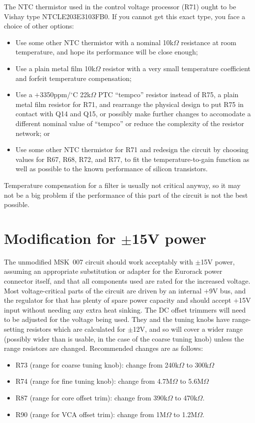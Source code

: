 The NTC thermistor used in the control voltage processor (R71) ought to be
Vishay type NTCLE203E3103FB0.  If you cannot get this exact type, you
face a choice of other options:
\begin{itemize}
\item Use some other NTC thermistor with a nominal 10k$\Omega$ resistance at
room temperature, and hope its performance will be close enough;
\item Use a plain metal film 10k$\Omega$ resistor with a very small
temperature coefficient and forfeit temperature compensation;
\item Use a $+$3350ppm/$^\circ$C 22k$\Omega$ PTC ``tempco'' resistor
instead of R75, a plain metal film resistor for R71, and rearrange the
physical design to put R75 in contact with Q14 and Q15, or possibly make
further changes to accomodate a different nominal value of ``tempco''
or reduce the complexity of the resistor network; or
\item Use some other NTC thermistor for R71 and redesign the circuit by
choosing values for R67, R68, R72, and R77, to fit the temperature-to-gain
function as well as possible to the known performance of silicon transistors.
\end{itemize}
Temperature compensation for a filter is usually not critical anyway, so it
may not be a big problem if the performance of this part of the circuit is
not the best possible.

\section{Modification for $\pm$15V power}

The unmodified MSK~007 circuit should work acceptably with $\pm$15V power,
assuming an appropriate substitution or adapter for the Eurorack power
connector itself, and that all components used are rated for the increased
voltage.  Most voltage-critical parts of the circuit are driven by an
internal $+$9V bus, and the regulator for that has plenty of spare power
capacity and should accept $+$15V input without needing any extra heat
sinking.  The DC offset trimmers will need to be adjusted for the voltage
being used.  They and the tuning knobs have range-setting resistors which
are calculated for $\pm$12V, and so will cover a wider range (possibly wider
than is usable, in the case of the coarse tuning knob) unless the range
resistors are changed.  Recommended changes are as follows:

\begin{itemize}
\item R73 (range for coarse tuning knob):  change from 240k$\Omega$ to
  300k$\Omega$
\item R74 (range for fine tuning knob):  change from 4.7M$\Omega$ to
  5.6M$\Omega$
\item R87 (range for core offset trim):  change from 390k$\Omega$ to
  470k$\Omega$.
\item R90 (range for VCA offset trim):  change from 1M$\Omega$ to
  1.2M$\Omega$.
\end{itemize}

